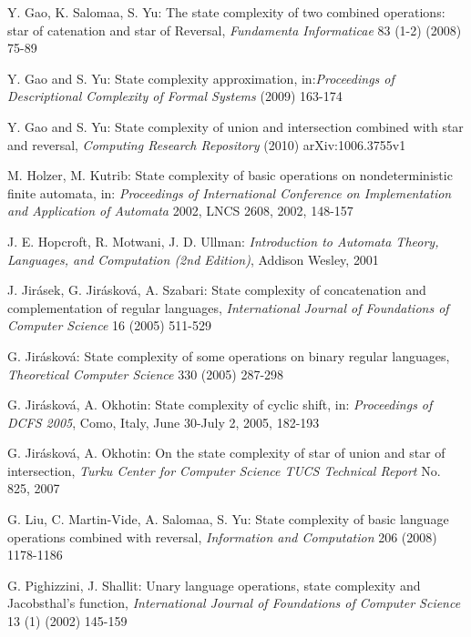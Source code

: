\documentclass[10pt]{article}
\begin{document}
\begin{thebibliography}{9}
    Y. Gao, K. Salomaa, S. Yu:
    The state complexity of two combined operations: star of catenation and star of Reversal,
    {\it Fundamenta Informaticae} 83 (1-2) (2008) 75-89

    Y. Gao and S. Yu:
    State complexity approximation,
    in:{\it Proceedings of Descriptional Complexity of Formal Systems} (2009) 163-174

    Y. Gao and S. Yu:
    State complexity of union and intersection combined with star and reversal,
    {\it Computing Research Repository} (2010) arXiv:1006.3755v1

    M. Holzer, M. Kutrib:
    State complexity of basic operations on nondeterministic finite automata,
    in: {\it Proceedings of International Conference on Implementation and Application of Automata} 2002,
    LNCS 2608, 2002, 148-157

    J. E. Hopcroft, R. Motwani, J. D. Ullman:
    {\it Introduction to Automata Theory, Languages, and Computation (2nd Edition)},
    Addison Wesley, 2001

    J. Jir\'{a}sek, G. Jir\'{a}skov\'{a}, A. Szabari:
    State complexity of concatenation and complementation of regular languages,
    {\it International Journal of Foundations of Computer Science} 16 (2005) 511-529

    G. Jir\'{a}skov\'{a}:
    State complexity of some operations on binary regular languages,
    {\it Theoretical Computer Science} 330 (2005) 287-298

    G. Jir\'{a}skov\'{a}, A. Okhotin:
    State complexity of cyclic shift,
    in: {\it Proceedings of DCFS 2005}, Como, Italy, June 30-July 2, 2005, 182-193

    G. Jir\'{a}skov\'{a}, A. Okhotin:
    On the state complexity of star of union and star of intersection,
    {\it Turku Center for Computer Science TUCS Technical Report} No. 825, 2007

    G. Liu, C. Martin-Vide, A. Salomaa, S. Yu:
    State complexity of basic language operations combined with reversal,
    {\it Information and Computation} 206 (2008) 1178-1186

    G. Pighizzini, J. Shallit:
    Unary language operations, state complexity and Jacobsthal's function,
    {\it International Journal of Foundations of Computer Science} 13 (1) (2002) 145-159


\end{thebibliography}
\end{document}
